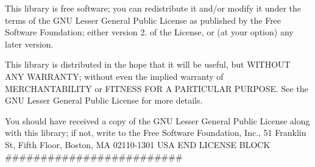 This library is free software; you can redistribute it and/or modify it under the terms of the G\+NU Lesser General Public License as published by the Free Software Foundation; either version 2. of the License, or (at your option) any later version.

This library is distributed in the hope that it will be useful, but W\+I\+T\+H\+O\+UT A\+NY W\+A\+R\+R\+A\+N\+TY; without even the implied warranty of M\+E\+R\+C\+H\+A\+N\+T\+A\+B\+I\+L\+I\+TY or F\+I\+T\+N\+E\+SS F\+OR A P\+A\+R\+T\+I\+C\+U\+L\+AR P\+U\+R\+P\+O\+SE. See the G\+NU Lesser General Public License for more details.

You should have received a copy of the G\+NU Lesser General Public License along with this library; if not, write to the Free Software Foundation, Inc., 51 Franklin St, Fifth Floor, Boston, MA 02110-\/1301 U\+SA E\+ND L\+I\+C\+E\+N\+SE B\+L\+O\+CK \#\#\#\#\#\#\#\#\#\#\#\#\#\#\#\#\#\#\#\#\#\#\#\#\# 